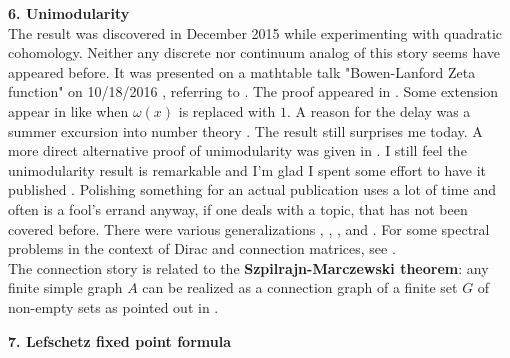 \documentclass[12pt]{amsart}
\begin{document}
{\bf 6.  Unimodularity} \\

The result was discovered in December 2015 while experimenting 
with quadratic cohomology. Neither any discrete nor continuum analog of this story
seems have appeared before. 
It was presented on a mathtable talk "Bowen-Lanford Zeta function"
on 10/18/2016 \cite{KnillBowenLanford}, referring to \cite{BowenLanford}.
The proof appeared in \cite{Unimodularity}. Some extension appear in \cite{CountingMatrix}
like when $\omega(x)$ is replaced with $1$.
A reason for the delay was a summer excursion into number theory \cite{Experiments}.
The result still surprises me today. A more direct alternative proof of unimodularity 
was given in \cite{MukherjeeBera2018}. I still feel the unimodularity result is remarkable and
I'm glad I spent some effort to have it published \cite{KnillEnergy2020}. Polishing something for
an actual publication uses a lot of time and often is a fool's errand anyway, if one deals with 
a topic, that has not been covered before. There were various generalizations
\cite{GreenFunctionsEnergized},
\cite{EnergizedSimplicialComplexes},
\cite{EnergizedSimplicialComplexes2}, and
\cite{EnergizedSimplicialComplexes3}. For some spectral problems in the 
context of Dirac and connection matrices, see \cite{ConnectionDirac}. \\
The connection story is related to the {\bf Szpilrajn-Marczewski theorem}: any finite simple graph 
$A$ can be realized as a connection graph of a finite set $G$ of non-empty sets 
\cite{Szipilrajn-Marczewski,ErdoesGoodmanPosa} as pointed out in \cite{ComplexesGraphsProductsShannonCapacity}. \\

{\bf 7. Lefschetz fixed point formula} \\
\end{document}
